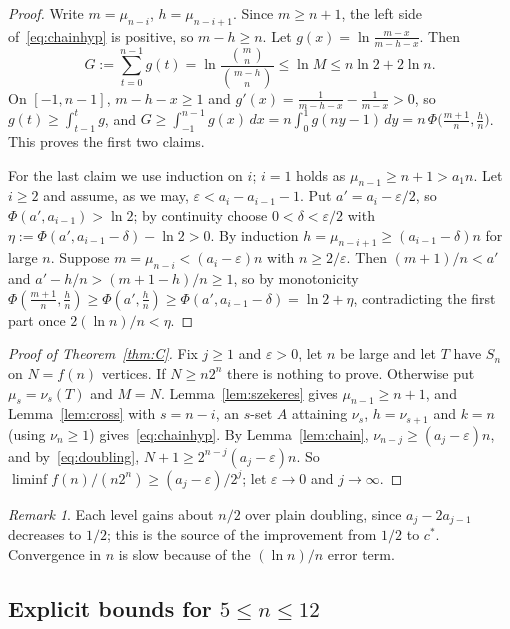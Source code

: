 \documentclass[11pt]{amsart}
\theoremstyle{definition}
\theoremstyle{remark}
\newtheorem{remark}[theorem]{Remark}
\newcommand{\cs}{c^{*}}
\begin{document}
\begin{proof}
Write $m=\mu_{n-i}$, $h=\mu_{n-i+1}$. Since $m\ge n+1$, the left side of~\eqref{eq:chainhyp} is positive, so $m-h\ge n$. Let
$g(x)=\ln\frac{m-x}{m-h-x}$. Then
\[
  G:=\sum_{t=0}^{n-1}g(t)=\ln\frac{\binom mn}{\binom{m-h}n}\le\ln M\le n\ln2+2\ln n.
\]
On $[-1,n-1]$, $m-h-x\ge1$ and $g'(x)=\frac1{m-h-x}-\frac1{m-x}>0$, so $g(t)\ge\int_{t-1}^tg$, and
$G\ge\int_{-1}^{n-1}g(x)\,dx=n\int_0^1g(ny-1)\,dy=n\,\Phi\bigl(\tfrac{m+1}n,\tfrac hn\bigr)$. This proves the first two claims.

For the last claim we use induction on $i$; $i=1$ holds as $\mu_{n-1}\ge n+1>a_1n$. Let $i\ge2$ and assume, as we may,
$\varepsilon<a_i-a_{i-1}-1$. Put $a'=a_i-\varepsilon/2$, so $\Phi(a',a_{i-1})>\ln2$; by continuity choose $0<\delta<\varepsilon/2$ with
$\eta:=\Phi(a',a_{i-1}-\delta)-\ln2>0$. By induction $h=\mu_{n-i+1}\ge(a_{i-1}-\delta)n$ for large $n$. Suppose
$m=\mu_{n-i}<(a_i-\varepsilon)n$ with $n\ge2/\varepsilon$. Then $(m+1)/n<a'$ and $a'-h/n>(m+1-h)/n\ge1$, so by monotonicity
$\Phi(\frac{m+1}n,\frac hn)\ge\Phi(a',\frac hn)\ge\Phi(a',a_{i-1}-\delta)=\ln2+\eta$, contradicting the first part once
$2(\ln n)/n<\eta$.
\end{proof}

\begin{proof}[Proof of Theorem~\ref{thm:C}]
Fix $j\ge1$ and $\varepsilon>0$, let $n$ be large and let $T$ have $S_n$ on $N=f(n)$ vertices. If $N\ge n2^n$ there is nothing to
prove. Otherwise put $\mu_s=\nu_s(T)$ and $M=N$. Lemma~\ref{lem:szekeres} gives $\mu_{n-1}\ge n+1$, and Lemma~\ref{lem:cross} with
$s=n-i$, an $s$-set $A$ attaining $\nu_s$, $h=\nu_{s+1}$ and $k=n$ (using $\nu_n\ge1$) gives~\eqref{eq:chainhyp}. By
Lemma~\ref{lem:chain}, $\nu_{n-j}\ge(a_j-\varepsilon)n$, and by~\eqref{eq:doubling}, $N+1\ge2^{n-j}(a_j-\varepsilon)n$. So
$\liminf f(n)/(n2^n)\ge(a_j-\varepsilon)/2^j$; let $\varepsilon\to0$ and $j\to\infty$.
\end{proof}

\begin{remark}
Each level gains about $n/2$ over plain doubling, since $a_j-2a_{j-1}$ decreases to $1/2$; this is the source of the improvement
from $1/2$ to $\cs$. Convergence in $n$ is slow because of the $(\ln n)/n$ error term.
\end{remark}

\subsection{\texorpdfstring{Explicit bounds for $5\le n\le12$}{Explicit bounds for 5 <= n <= 12}}\label{sec:table}
\end{document}
